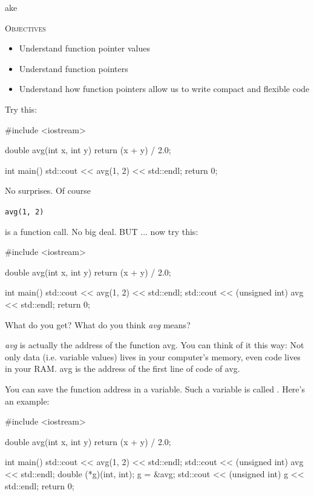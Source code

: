 ake\newpage{}

\textsc{Objectives}
\begin{itemize}
\item Understand function pointer values
\item Understand function pointers
\item Understand how function pointers allow us to write compact and flexible code
\end{itemize}


\newpage{}

Try this:

\begin{consolethree}[escapeinside=||]
#include <iostream>

double avg(int x, int y)
{
    return (x + y) / 2.0;
}

int main()
{
    std::cout << avg(1, 2) << std::endl;
    return 0;
}
\end{consolethree}

No surprises. Of course

\verb!avg(1, 2)!

is a function call. No big deal. BUT ... now try this:

\begin{consolethree}[escapeinside=||]
#include <iostream>

double avg(int x, int y)
{
    return (x + y) / 2.0;
}

int main()
{
    std::cout << avg(1, 2) << std::endl;
    std::cout << (unsigned int) avg << std::endl;
    return 0;
}
\end{consolethree}

What do you get? What do you think \textit{avg} means?

\textit{avg} is actually the address of the function avg. You can think of
it this way: Not only data (i.e. variable values) lives in your
computer's memory, even code lives in your RAM. avg is
the address of the first line of code of avg.

You can save the function address in a variable. Such a variable is
called . Here's an example:

\begin{consolethree}[escapeinside=||]
#include <iostream>

double avg(int x, int y)
{
    return (x + y) / 2.0;
}

int main()
{
    std::cout << avg(1, 2) << std::endl;
    std::cout << (unsigned int) avg << std::endl;
    double (*g)(int, int);
    g = &avg;
    std::cout << (unsigned int) g << std::endl;
    return 0;
}
\end{consolethree}

